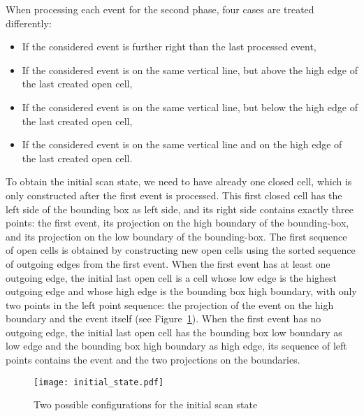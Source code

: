 \documentclass[a4paper, USenglish, cleveref, autoref, thm-restate]{lipics-v2021}
\begin{document}
When processing each event for the second phase,
four cases are treated differently:
\begin{itemize}
\item If the considered event is further right than the last processed event,
\item If the considered event is on the same vertical line, but above the
high edge of the last created open cell,
\item If the considered event is on the same vertical line, but below the
high edge of the last created open cell,
\item If the considered event is on the same vertical line and on the
  high edge of the last created open cell.
\end{itemize}

To obtain the initial scan state, we need to have already one closed
cell, which is only constructed after the first event is processed.
This first closed cell has the left side of the bounding box as left
side, and its right side contains exactly three points: the first
event, its projection on the high boundary of the bounding-box, and its
projection on the low boundary of the bounding-box.  The first
sequence of open cells is obtained by constructing new open cells
using the sorted sequence of outgoing edges from the first event.
When the first event has at least
one outgoing edge, the initial last open cell is a cell whose low edge
is the highest outgoing edge and whose high edge is the bounding box
high boundary, with only two points in the left point sequence: the
projection of the event on the high boundary and the event itself (see Figure~\ref{figure:initial}).
When the first event has no outgoing edge, the initial last open cell
has the bounding box low boundary as low edge and the bounding box
high boundary as high edge, its sequence of left points contains the
event and the two projections on the boundaries.
\begin{figure}
\texttt{[image: initial\_state.pdf]}
\caption{\label{figure:initial}Two possible configurations for the initial scan state}
\end{figure}
\end{document}
